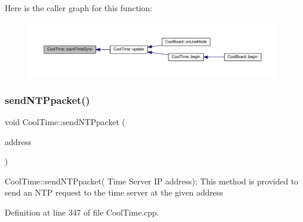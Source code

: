 Here is the caller graph for this function\+:\nopagebreak
\begin{figure}[H]
\begin{center}
\leavevmode
\includegraphics[width=350pt]{d6/d49/class_cool_time_ae9658c9b377510d469e3b88edf33ee85_icgraph}
\end{center}
\end{figure}
\mbox{\label{class_cool_time_a236a38d120dc53bc67456d763838c5a1}} 
\subsubsection{\texorpdfstring{send\+N\+T\+Ppacket()}{sendNTPpacket()}}
{\footnotesize\ttfamily void Cool\+Time\+::send\+N\+T\+Ppacket (\begin{DoxyParamCaption}\item[{I\+P\+Address \&}]{address }\end{DoxyParamCaption})}

Cool\+Time\+::send\+N\+T\+Ppacket( Time Server I\+P address)\+: This method is provided to send an N\+TP request to the time server at the given address 

Definition at line 347 of file Cool\+Time.\+cpp.


